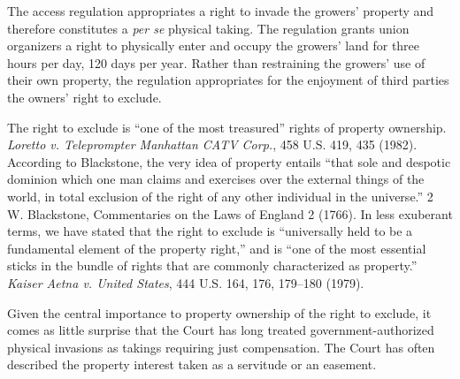 


The access regulation appropriates a right to invade the growers' property and
therefore constitutes a \textit{per se} physical taking. The regulation grants
union organizers a right to physically enter and occupy the growers' land for
three hours per day, 120 days per year. Rather than restraining the growers' use
of their own property, the regulation appropriates for the enjoyment of third
parties the owners' right to exclude.


The right to exclude is ``one of the most treasured'' rights of property
ownership. \textit{Loretto v. Teleprompter Manhattan CATV Corp.}, 458 U.S. 419,
435 (1982). According to Blackstone, the very idea of property entails ``that
sole and despotic dominion which one man claims and exercises over the external
things of the world, in total exclusion of the right of any other individual in
the universe.'' 2 W. Blackstone, Commentaries on the Laws of England 2 (1766).
In less exuberant terms, we have stated that the right to exclude is
``universally held to be a fundamental element of the property right,'' and is
``one of the most essential sticks in the bundle of rights that are commonly
characterized as property.'' \textit{Kaiser Aetna v. United States}, 444 U.S.
164, 176, 179--180 (1979).


Given the central importance to property ownership of the right to exclude, it
comes as little surprise that the Court has long treated government-authorized
physical invasions as takings requiring just compensation. The Court has often
described the property interest taken as a servitude or an easement.

